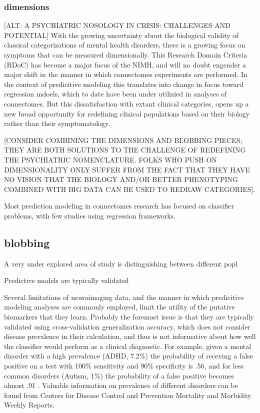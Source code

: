 \subsubsection{dimensions} [ALT: A PSYCHIATRIC NOSOLOGY IN CRISIS: CHALLENGES AND POTENTIAL]
With the growing uncertainty about the biological validity of classical categorizations
of mental health disorders, there is a growing focus on symptoms that can be measured dimensionally. This 
Research Domain Criteria (RDoC) has become a major focus of the NIMH, and will no doubt engender a major shift in the 
manner in which connectomes experiments are performed. In the context of predicitive modeling this translates into change in
focus toward regression mdoels, which to date have been under utilizied in analyses of connectomes. But this dissatisfaction
with extant clinical categories, opens up a new broad opportunity for redefining clinical populations based on their 
biology rather than their symptomatology.

[CONSIDER COMBINING THE DIMENSIONS AND BLOBBING PIECES; THEY ARE BOTH SOLUTIONS TO THE CHALLENGE OF REDEFINING THE PSYCHIATRIC
NOMENCLATURE. FOLKS WHO PUSH ON DIMENSIONALITY ONLY SUFFER FROM THE FACT THAT THEY HAVE NO VISION THAT THE BIOLOGY AND/OR 
BETTER PHENOTYPING COMBINED WITH BIG DATA CAN BE USED TO REDRAW CATEGORIES].


Most prediction modeling in connectomes research has focused on classifier problems, with few studies using
regression frameworks. 

\subsection{blobbing}

A very under explored area of study is distinguishing between different popl

Predictive models are 
typically validated 


Several limitations of neuroimaging data, and the manner in which predicitive modeling analyses are 
commonly employed, limit the utility of the putative biomarkers that they learn. Probably the foremost
issue is that they are typically validated using cross-validation generalization accuracy, which does not
consider disease prevalence in their calculation, and thus is not informative about how well the classifier
would perform as a clinical diagnostic. For example, given a mental disorder with a high prevalence
(ADHD, 7.2\%) the probability of receving a false positive on a test with 100\% sensitivity and 90\% specificity
is .56, and for less common disorders (Autism, 1\%) the probability of a false positive becomes almost .91 \cite{grimes,altmanbland}.
Valuable information on prevalence of different disorders can be found from Centers for Disease Control and Prevention Mortality
and Morbidity Weekly Reports.  

